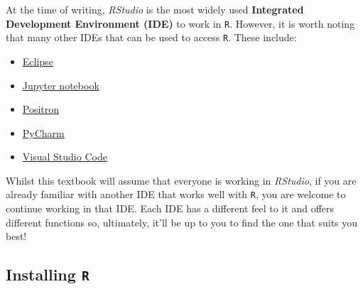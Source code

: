 \documentclass[
  letterpaper,
  DIV=11,
  numbers=noendperiod]{scrreprt}
\providecommand{\tightlist}{%
  \setlength{\itemsep}{0pt}\setlength{\parskip}{0pt}}
\begin{document}
\begin{tcolorbox}[enhanced jigsaw, arc=.35mm, bottomrule=.15mm, bottomtitle=1mm, breakable, colback=white, colbacktitle=quarto-callout-note-color!10!white, colframe=quarto-callout-note-color-frame, coltitle=black, left=2mm, leftrule=.75mm, opacityback=0, opacitybacktitle=0.6, rightrule=.15mm, title=\textcolor{quarto-callout-note-color}{\faInfo}\hspace{0.5em}{Using other IDEs to work in \texttt{R}}, titlerule=0mm, toprule=.15mm, toptitle=1mm]

At the time of writing, \emph{RStudio} is the most widely used
\textbf{Integrated Development Environment (IDE)} to work in \texttt{R}.
However, it is worth noting that many other IDEs that can be used to
access \texttt{R}. These include:

\begin{itemize}
\tightlist
\item
  \href{https://eclipseide.org/}{Eclipse}
\item
  \href{https://jupyter.org/}{Jupyter notebook}
\item
  \href{https://positron.posit.co/}{Positron}
\item
  \href{https://www.jetbrains.com/pycharm/}{PyCharm}
\item
  \href{https://code.visualstudio.com/}{Visual Studio Code}
\end{itemize}

Whilst this textbook will assume that everyone is working in
\emph{RStudio}, if you are already familiar with another IDE that works
well with \texttt{R}, you are welcome to continue working in that IDE.
Each IDE has a different feel to it and offers different functions so,
ultimately, it'll be up to you to find the one that suits you best!

\end{tcolorbox}

\subsection{\texorpdfstring{Installing
\texttt{R}}{Installing R}}\label{sec-installingR}
\end{document}
